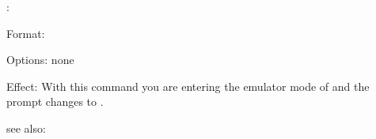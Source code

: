 :

Format: 

Options: none

Effect: With this command you are entering the emulator mode of \FORWARD{} and the
	prompt changes to .

see also:  


